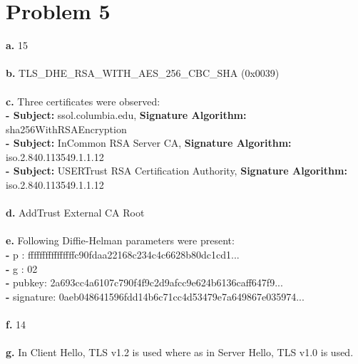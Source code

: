 \documentclass[10pt]{article}
\begin{document}
\section{Problem 5}
\textbf{a.} 15\\\\
\textbf{b.} TLS\_DHE\_RSA\_WITH\_AES\_256\_CBC\_SHA (0x0039)\\\\
\textbf{c.} Three certificates were observed:\\
\textbf{- Subject:} ssol.columbia.edu, \textbf{Signature Algorithm:} sha256WithRSAEncryption\\
\textbf{- Subject:} InCommon RSA Server CA, \textbf{Signature Algorithm:} iso.2.840.113549.1.1.12\\
\textbf{- Subject:} USERTrust RSA Certification Authority, \textbf{Signature Algorithm:} iso.2.840.113549.1.1.12\\\\
\textbf{d.} AddTrust External CA Root\\\\
\textbf{e.} Following Diffie-Helman parameters were present:\\
\textbf{-} p : ffffffffffffffffc90fdaa22168c234c4c6628b80dc1cd1...\\
\textbf{-} g : 02\\
\textbf{-} pubkey: 2a693cc4a6107c790f4f9c2d9afcc9e624b6136caff647f9...\\
\textbf{-} signature: 0aeb048641596fdd14b6c71cc4d53479e7a649867e035974...\\\\
\textbf{f.} 14\\\\
\textbf{g.} In Client Hello, TLS v1.2 is used where as in Server Hello, TLS v1.0 is used. 
\end{document}
